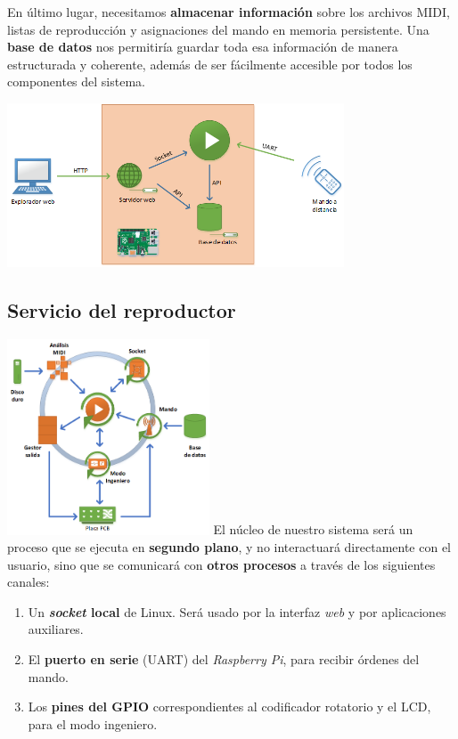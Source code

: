\documentclass[10pt,a4paper]{article}
\begin{document}
	En último lugar, necesitamos \textbf{almacenar información} sobre los archivos MIDI, listas de reproducción y asignaciones del mando en memoria persistente. Una \textbf{base de datos} nos permitiría guardar toda esa información de manera estructurada y coherente, además de ser fácilmente accesible por todos los componentes del sistema.
		
	\begin{center}
		\includegraphics[width=0.75\textwidth]{images/general}
	\end{center}
	
	\clearpage
	\subsection{Servicio del reproductor}
	
	\begin{multicols}{2}
		\noindent
		\includegraphics[width=0.45\textwidth]{images/reproductor} 
		\columnbreak
		El núcleo de nuestro sistema será un proceso que se ejecuta en \textbf{segundo plano}, y no interactuará directamente con el usuario, sino que se comunicará con \textbf{otros procesos} a través de los siguientes canales:
		
		\begin{enumerate}
			\item Un \textbf{\textit{socket} local} de Linux. Será usado  por la interfaz \textit{web} y por aplicaciones auxiliares.
			
			\item El \textbf{puerto en serie} (UART) del \textit{Raspberry Pi}, para recibir órdenes del mando.
			
			\item Los \textbf{pines del GPIO} correspondientes al codificador rotatorio y el LCD, para el modo ingeniero.
		\end{enumerate}
	\end{multicols}
	
\end{document}
